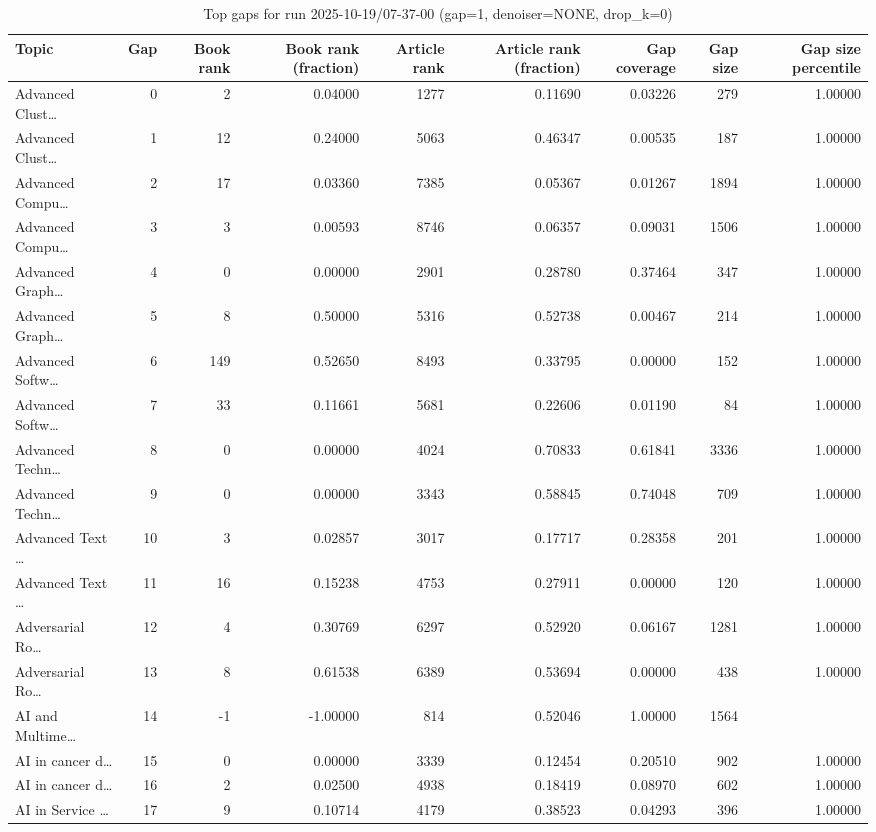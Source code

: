 \begin{table}
\caption{Top gaps for run 2025-10-19/07-37-00 (gap=1, denoiser=NONE, drop\_k=0)}
\label{tab:best_run_gap1_2025_10_19_07_37_00}
\begin{tabular}{lrrrrrrrr}
\toprule
Topic & Gap & Book rank & Book rank (fraction) & Article rank & Article rank (fraction) & Gap coverage & Gap size & Gap size percentile \\
\midrule
Advanced Clust… & 0 & 2 & 0.04000 & 1277 & 0.11690 & 0.03226 & 279 & 1.00000 \\
Advanced Clust… & 1 & 12 & 0.24000 & 5063 & 0.46347 & 0.00535 & 187 & 1.00000 \\
Advanced Compu… & 2 & 17 & 0.03360 & 7385 & 0.05367 & 0.01267 & 1894 & 1.00000 \\
Advanced Compu… & 3 & 3 & 0.00593 & 8746 & 0.06357 & 0.09031 & 1506 & 1.00000 \\
Advanced Graph… & 4 & 0 & 0.00000 & 2901 & 0.28780 & 0.37464 & 347 & 1.00000 \\
Advanced Graph… & 5 & 8 & 0.50000 & 5316 & 0.52738 & 0.00467 & 214 & 1.00000 \\
Advanced Softw… & 6 & 149 & 0.52650 & 8493 & 0.33795 & 0.00000 & 152 & 1.00000 \\
Advanced Softw… & 7 & 33 & 0.11661 & 5681 & 0.22606 & 0.01190 & 84 & 1.00000 \\
Advanced Techn… & 8 & 0 & 0.00000 & 4024 & 0.70833 & 0.61841 & 3336 & 1.00000 \\
Advanced Techn… & 9 & 0 & 0.00000 & 3343 & 0.58845 & 0.74048 & 709 & 1.00000 \\
Advanced Text … & 10 & 3 & 0.02857 & 3017 & 0.17717 & 0.28358 & 201 & 1.00000 \\
Advanced Text … & 11 & 16 & 0.15238 & 4753 & 0.27911 & 0.00000 & 120 & 1.00000 \\
Adversarial Ro… & 12 & 4 & 0.30769 & 6297 & 0.52920 & 0.06167 & 1281 & 1.00000 \\
Adversarial Ro… & 13 & 8 & 0.61538 & 6389 & 0.53694 & 0.00000 & 438 & 1.00000 \\
AI and Multime… & 14 & -1 & -1.00000 & 814 & 0.52046 & 1.00000 & 1564 &  \\
AI in cancer d… & 15 & 0 & 0.00000 & 3339 & 0.12454 & 0.20510 & 902 & 1.00000 \\
AI in cancer d… & 16 & 2 & 0.02500 & 4938 & 0.18419 & 0.08970 & 602 & 1.00000 \\
AI in Service … & 17 & 9 & 0.10714 & 4179 & 0.38523 & 0.04293 & 396 & 1.00000 \\

\end{tabular}
\end{table}
